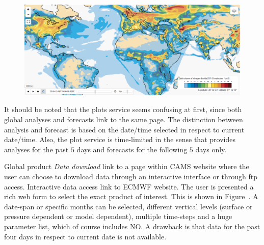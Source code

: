 \documentclass[9pt]{report}
\begin{document}
\begin{figure}[h!]%
\begin{mdcenter}%

\noindent{}\includegraphics[keepaspectratio=true,width=\dimmin{}{\dimwidth{0.90}}]{images/global_map}{}%

\mdhr{}%

\noindent{}%
\end{mdcenter}\label{global-map}%
\end{figure}%

\noindent{}It should be noted that the plots service seems confusing at first, since both global analyses and forecasts link to the same page.
The distinction between analysis and forecast is based on the date/time selected in respect to current date/time.
Also, the plot service is time-limited in the sense that provides analyses for the past $5$ days and forecasts for the following $5$ days only.%

Global product \emph{Data download} link to a page within CAMS website where the user can choose to download data through an interactive interface or through ftp access.
Interactive data access link to ECMWF website. The user is presented a rich web form to select the exact product of interest. This is shown in Figure~.
A date-span or specific months can be selected, different vertical levels (surface or pressure dependent or model dependent), multiple time-steps and a huge parameter list, which of course includes NO.
A drawback is that data for the past four days in respect to current date is not available.%
\end{document}
